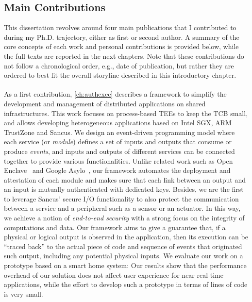 \subsection{Main Contributions}

This dissertation revolves around four main publications that I contributed to
during my Ph.D. trajectory, either as first or second author. A summary of the
core concepts of each work and personal contributions is provided below, while
the full texts are reported in the next chapters. Note that these contributions
do not follow a chronological order, e.g., date of publication, but rather they
are ordered to best fit the overall storyline described in this introductory
chapter.

\paragraph{\paperauthexectitle}

As a first contribution, \cref{ch:authexec} describes a framework to simplify
the development and management of distributed applications on shared
infrastructures. This work focuses on process-based \acp{TEE} to keep the
\ac{TCB} small, and allows developing heterogeneous applications based on Intel
\ac{SGX}, ARM TrustZone and Sancus. We design an event-driven programming model
where each service (or \emph{module}) defines a set of inputs and outputs that
consume or produce \emph{events}, and inputs and outputs of different services
can be connected together to provide various functionalities. Unlike related
work such as Open Enclave~\cite{openenclave} and Google
Asylo~\cite{googleasylo}, our framework automates the deployment and attestation
of each module and makes sure that each link between an output and an input is
mutually authenticated with dedicated keys. Besides, we are the first to
leverage Sancus' secure I/O functionality to also protect the communication
between a service and a peripheral such as a sensor or an actuator. In this way,
we achieve a notion of \emph{end-to-end security} with a strong focus on the
integrity of computations and data. Our framework aims to give a guarantee that,
if a physical or logical output is observed in the application, then its
execution can be ``traced back'' to the actual piece of code and sequence of
events that originated such output, including any potential physical inputs. We
evaluate our work on a prototype based on a smart home system: Our results show
that the performance overhead of our solution does not affect user experience
for near real-time applications, while the effort to develop such a prototype in
terms of lines of code is very small. 

